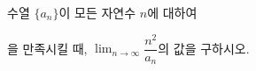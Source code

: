 수열 $\{a_n\}$이 모든 자연수 $n$에 대하여 \par\smallskip{}\par\smallskip\noindent 을 만족시킬 때, $\displaystyle\lim_{n\to\infty}\dfrac{n^2}{a_n}$의 값을 구하시오.

